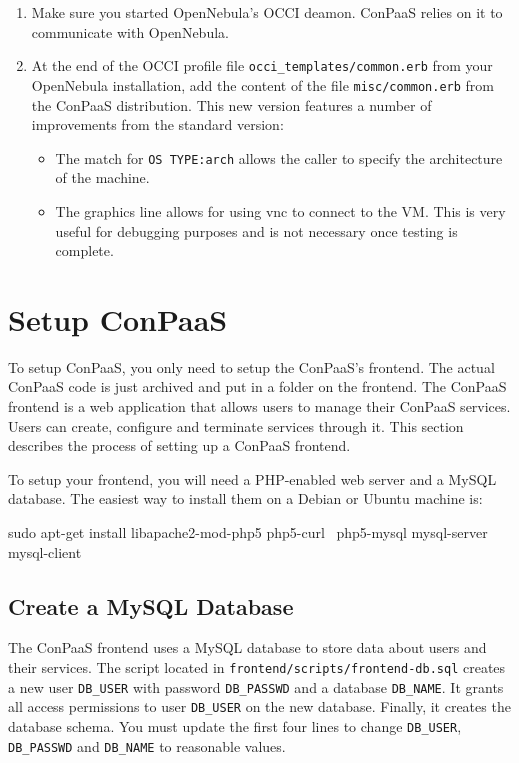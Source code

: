 \documentclass[10pt]{article}
\begin{document}
\begin{enumerate}
\item Make sure you started OpenNebula's OCCI deamon. ConPaaS relies
  on it to communicate with OpenNebula.

\item At the end of the OCCI profile file \verb+occi_templates/common.erb+ 
  from your OpenNebula installation, add the content of the file
  \verb+misc/common.erb+ from the ConPaaS distribution. This new version 
  features a number of improvements from the standard version:
  \begin{itemize}
  \item The match for \verb+OS TYPE:arch+ allows the caller to specify
    the architecture of the machine.
  \item The graphics line allows for using vnc to connect to the VM.
    This is very useful for debugging purposes and is not necessary
    once testing is complete.
  \end{itemize}
\end{enumerate}

\section{Setup ConPaaS}

To setup ConPaaS, you only need to setup the ConPaaS's frontend. The
actual ConPaaS code is just archived and put in a folder on the frontend.
The ConPaaS frontend is a web application that allows users to manage
their ConPaaS services. Users can create, configure and terminate
services through it. This section describes the process of setting up
a ConPaaS frontend.

To setup your frontend, you will need a PHP-enabled web server and a
MySQL database. The easiest way to install them on a Debian or Ubuntu
machine is:

\begin{code}
  sudo apt-get install libapache2-mod-php5 php5-curl \
     php5-mysql mysql-server mysql-client
\end{code}

\subsection{Create a MySQL Database}

The ConPaaS frontend uses a MySQL database to store data about users
and their services. The script located in
\verb+frontend/scripts/frontend-db.sql+ creates a new user
\verb+DB_USER+ with password \verb+DB_PASSWD+ and a database
\verb+DB_NAME+. It grants all access permissions to user
\verb+DB_USER+ on the new database. Finally, it creates the database
schema. You must update the first four lines to change \verb+DB_USER+,
\verb+DB_PASSWD+ and \verb+DB_NAME+ to reasonable values.
\end{document}
